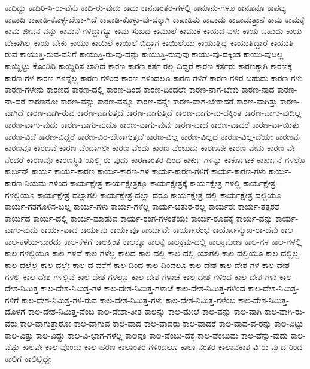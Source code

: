 {ಕಾದಿದ್ದು
ಕಾದಿರಿ-ಸಿ-ರು-ವೆನು
ಕಾದಿ-ರು-ವುದು
ಕಾದು
ಕಾನನಾಂತರ-ಗಳಲ್ಲಿ
ಕಾನೂನು-ಗಳೂ
ಕಾನೂನೂ
ಕಾಪಟ್ಯ
ಕಾಪಾಡಿ
ಕಾಪಾಡಿ-ಕೊಳ್ಳ-ಬೇಕಾ-ಗಿದೆ
ಕಾಪಾಡಿ-ಕೊಳ್ಳು-ವು-ದಕ್ಕಾಗಿ
ಕಾಪಾಡಿತು
ಕಾಪಾಡು
ಕಾಪಾಡುತ್ತಾನೆ
ಕಾಮ
ಕಾಮಕ್ಕೆ
ಕಾಮ-ಜೀವನ-ವನ್ನು
ಕಾಮನೆ-ಗಳಿದ್ದಾಗ್ಯೂ
ಕಾಮ-ಸುಖದ
ಕಾಮಾಲೆ
ಕಾಮುಕ
ಕಾಯದ-ವಳು
ಕಾಯ-ಬಹುದು
ಕಾಯ-ಬೇಕಾಗಿಲ್ಲ
ಕಾಯ-ಬೇಕು
ಕಾಯಾ
ಕಾಯಿಲೆ
ಕಾಯಿಲೆ-ಬಿದ್ದಾಗ
ಕಾಯಿಲೆಯು
ಕಾಯುತ್ತಿದ್ದ
ಕಾಯುತ್ತಿದ್ದಾರೆ
ಕಾಯುತ್ತಿ-ರುವ
ಕಾಯುತ್ತಿ-ರುವ-ವನಿಗೆ
ಕಾಯುತ್ತಿ-ರು-ವು-ದನ್ನು
ಕಾಯುತ್ತಿ-ರುವುವು
ಕಾಯು-ವು-ದಕ್ಕಿಂತ
ಕಾಯು-ವುದಿಲ್ಲ
ಕಾಯ್ದಿಟ್ಟು-ಕೊಂಡಿರಿ
ಕಾಯ್ದಿರಿಸ-ಲಾಗಿದೆ
ಕಾರಣ
ಕಾರಣ-ಕರ್ತ-ರಲ್ಲ-ದಿದ್ದರೆ
ಕಾರಣ-ಕರ್ತರು
ಕಾರಣಕ್ಕಾಗಿ
ಕಾರಣಕ್ಕೆ
ಕಾರಣ-ಗಳ
ಕಾರಣ-ಗಳನ್ನೆಲ್ಲ
ಕಾರಣ-ಗಳಿಂದ
ಕಾರಣ-ಗಳಿಂದಲೂ
ಕಾರಣ-ಗಳಿಗೆ
ಕಾರಣ-ಗಳಿರ-ಬಹುದು
ಕಾರಣ-ಗಳು
ಕಾರಣ-ಗಳೇನು
ಕಾರಣದ
ಕಾರಣ-ದಲ್ಲಿ
ಕಾರಣ-ದಿಂದ
ಕಾರಣ-ದಿಂದಲೇ
ಕಾರಣ-ನಾಗ-ಬೇಕು
ಕಾರಣ-ನಾದ
ಕಾರಣ-ನಾ-ದರೆ
ಕಾರಣನೋ
ಕಾರಣ-ವನ್ನು
ಕಾರಣ-ವನ್ನೂ
ಕಾರಣ-ವನ್ನೇ
ಕಾರಣ-ವಾಗ-ಬೇಕಾದರೆ
ಕಾರಣ-ವಾಗಿತ್ತು
ಕಾರಣ-ವಾಗಿದೆ
ಕಾರಣ-ವಾಗಿ-ರುವ
ಕಾರಣ-ವಾಗುತ್ತದೆ
ಕಾರಣ-ವಾಗುತ್ತಿದೆ
ಕಾರಣ-ವಾಗು-ವು-ದಕ್ಕಿಂತ
ಕಾರಣ-ವಾಗು-ವುದಿಲ್ಲ
ಕಾರಣ-ವಾಗು-ವುದು
ಕಾರಣ-ವಾಗು-ವುದೊ
ಕಾರಣ-ವಾಗು-ವುವು
ಕಾರಣ-ವಾದ
ಕಾರಣ-ವಾದರೆ
ಕಾರಣ-ವಾ-ಯಿತು
ಕಾರಣ-ವಿದೆ
ಕಾರಣ-ವಿದ್ದರೆ
ಕಾರಣ-ವಿರ-ಬೇಕಾಗುತ್ತದೆ
ಕಾರಣ-ವಿಲ್ಲ
ಕಾರಣ-ವಿಲ್ಲದೆ
ಕಾರಣ-ವಿಲ್ಲ-ದೆಯೇ
ಕಾರಣವು
ಕಾರಣವೂ
ಕಾರಣವೆ
ಕಾರಣ-ವೆಂದಾಗಲೀ
ಕಾರಣ-ವೆಂದು
ಕಾರಣ-ವೆಂಬುದು
ಕಾರಣವೇ
ಕಾರಣ-ವೇನು
ಕಾರಣ-ವೇ-ನೆಂದರೆ
ಕಾರಣವೊ
ಕಾರಣಸ್ಥಿತಿ-ಯಲ್ಲಿ-ರು-ವುದು
ಕಾರಣಾಂತರ-ದಿಂದ
ಕಾರ್ಕು-ಗಳನ್ನು
ಕಾರ್ಕೊಟಕ
ಕಾರ್ಖಾನೆ-ಗಳಲ್ಲೊ
ಕಾರ್ಬನ್
ಕಾರ್ಯ
ಕಾರ್ಯ-ಕಾರಣ
ಕಾರ್ಯ-ಕಾರಣ-ಗಳ
ಕಾರ್ಯ-ಕಾರಣ-ಗಳಿಗೆ
ಕಾರ್ಯ-ಕಾರಣ-ಗಳು
ಕಾರ್ಯ-ಕಾರಣ-ನಿಯಮ-ಗಳಿಂದ
ಕಾರ್ಯಕ್ಷೇತ್ರ
ಕಾರ್ಯಕ್ಷೇತ್ರಕ್ಕೂ
ಕಾರ್ಯಕ್ಷೇತ್ರಕ್ಕೆ
ಕಾರ್ಯಕ್ಷೇತ್ರ-ಗಳಲ್ಲಿ
ಕಾರ್ಯಕ್ಷೇತ್ರ-ಗಳಲ್ಲಿಯೂ
ಕಾರ್ಯಕ್ಷೇತ್ರ-ದಲ್ಲಾಗಲಿ
ಕಾರ್ಯಕ್ಷೇತ್ರ-ದಲ್ಲಾ-ದರೂ
ಕಾರ್ಯಕ್ಷೇತ್ರ-ದಲ್ಲಿ
ಕಾರ್ಯಕ್ಷೇತ್ರ-ದಲ್ಲಿಯೂ
ಕಾರ್ಯ-ಗತಗೊಳಿಸ-ಬಲ್ಲ
ಕಾರ್ಯ-ಗಳು
ಕಾರ್ಯ-ಗಳೆಲ್ಲ
ಕಾರ್ಯ-ಚತುರ-ರಲ್ಲ
ಕಾರ್ಯತಃ
ಕಾರ್ಯ-ತತ್ಪರತೆ
ಕಾರ್ಯದ
ಕಾರ್ಯ-ದಲ್ಲಿ
ಕಾರ್ಯ-ಮಾಡುವ
ಕಾರ್ಯ-ರಂಗ-ಗಳಂತೆಯೇ
ಕಾರ್ಯ-ರೂಪಕ್ಕೆ
ಕಾರ್ಯ-ವನ್ನು
ಕಾರ್ಯ-ವಾಗು-ವುದು
ಕಾರ್ಯ-ವಾದ
ಕಾರ್ಯವು
ಕಾರ್ಯವೂ
ಕಾರ್ಯವೇ
ಕಾರ್ಯಾರಂಭ
ಕಾರ್ಯೋನ್ಮುಖ-ರಾ-ದೆವು
ಕಾಲ
ಕಾಲ-ಕಳೆಯ-ಬಾರದು
ಕಾಲ-ಕೆಳಗೆ
ಕಾಲಕ್ಕಿಂತ
ಕಾಲಕ್ಕೂ
ಕಾಲಕ್ಕೆ
ಕಾಲಕ್ರಮ-ದಲ್ಲಿ
ಕಾಲಕ್ರಮೇಣ
ಕಾಲ-ಗಳ
ಕಾಲ-ಗಳಲ್ಲಿ
ಕಾಲ-ಗಳಲ್ಲಿಯೂ
ಕಾಲ-ಗಳಿವೆ
ಕಾಲ-ಗಳೆಲ್ಲ
ಕಾಲದ
ಕಾಲ-ದಲ್ಲಿ
ಕಾಲ-ದಲ್ಲಿ-ಯಾಗಲಿ
ಕಾಲ-ದಲ್ಲಿಯೂ
ಕಾಲ-ದಲ್ಲಿಲ್ಲ
ಕಾಲ-ದಲ್ಲೆಲ್ಲ
ಕಾಲ-ದಲ್ಲೇ
ಕಾಲ-ದ-ವರೆಗೆ
ಕಾಲ-ದಿಂದ
ಕಾಲ-ದಿಂದಲೂ
ಕಾಲ-ದೇಶ
ಕಾಲ-ದೇಶ-ಗಳ
ಕಾಲ-ದೇಶ-ಗಳಲ್ಲಿ
ಕಾಲ-ದೇಶ-ಗಳಲ್ಲಿವೆ
ಕಾಲ-ದೇಶ-ಗಳಲ್ಲೂ
ಕಾಲ-ದೇಶ-ಗಳಾಚೆ
ಕಾಲ-ದೇಶ-ಗಳಿಂದ
ಕಾಲ-ದೇಶ-ಗಳು
ಕಾಲ-ದೇಶ-ನಿಮಿತ್ತ
ಕಾಲ-ದೇಶ-ನಿಮಿತ್ತ-ಗಳ
ಕಾಲ-ದೇಶ-ನಿಮಿತ್ತ-ಗಳಾಚೆ
ಕಾಲ-ದೇಶ-ನಿಮಿತ್ತ-ಗಳಿಂದ
ಕಾಲ-ದೇಶ-ನಿಮಿತ್ತ-ಗಳಿಗೆ
ಕಾಲ-ದೇಶ-ನಿಮಿತ್ತ-ಗಳಿ-ರುವ
ಕಾಲ-ದೇಶ-ನಿಮಿತ್ತ-ಗಳು
ಕಾಲ-ದೇಶ-ನಿಮಿತ್ತ-ಗಳೆಂಬ
ಕಾಲ-ದೇಶ-ನಿಮಿತ್ತ-ದೊಳಗೆ
ಕಾಲ-ದೇಶ-ನಿಮಿತ್ತ-ವೆಂಬ
ಕಾಲ-ದೇಶಾ-ತೀತ
ಕಾಲನ್ನು
ಕಾಲ-ಮೇಲೆ
ಕಾಲ-ವನ್ನು
ಕಾಲ-ವಾಗಿ
ಕಾಲ-ವಾಗಿ-ರು-ವರು
ಕಾಲ-ವಾಗುತ್ತಾರೋ
ಕಾಲ-ವಾಗುವ
ಕಾಲ-ವಾದ
ಕಾಲ-ವಾದರು
ಕಾಲ-ವಾದರೆ
ಕಾಲ-ವಾದ-ವ-ರನ್ನು
ಕಾಲ-ವಿಟ್ಟು
ಕಾಲ-ವಿತ್ತು
ಕಾಲ-ವಿದ್ದು
ಕಾಲ-ವಿ-ಭಾಗ-ಗಳೆಲ್ಲ
ಕಾಲವೂ
ಕಾಲ-ವೆಂಬು-ದಕ್ಕೆ
ಕಾಲ-ವೆಂಬುದು
ಕಾಲ-ವೆನ್ನು-ವುದು
ಕಾಲ-ವೆಷ್ಟು
ಕಾಲವೇ
ಕಾಲ-ವೊಂದು
ಕಾಲ-ಹರಣ
ಕಾಲಾಂತರ-ಗಳಿಂದಲೂ
ಕಾಲಾ-ನಂತರ
ಕಾಲಾವಕಾಶ-ವಿ-ರು-ವು-ದ-ರಿಂದ
ಕಾಲಿಗೆ
ಕಾಲಿಟ್ಟಿದ್ದೇ
}
